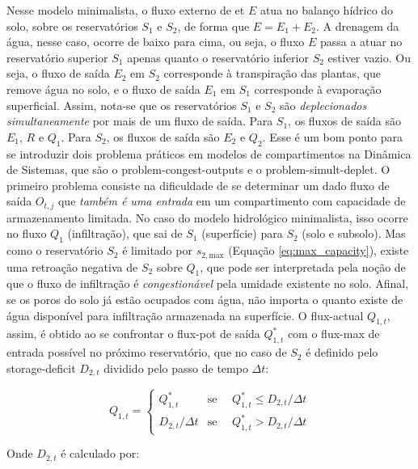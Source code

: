 \documentclass[./main.tex]{subfiles}
\begin{document}
\par Nesse modelo minimalista, o fluxo externo de \acrlong{et} $E$ atua no balanço hídrico do solo, sobre os reservatórios $S_1$ e $S_2$, de forma que $E = E_1 + E_2$. A drenagem da água, nesse caso, ocorre de baixo para cima, ou seja, o fluxo $E$ passa a atuar no reservatório superior $S_1$ apenas quanto o reservatório inferior $S_2$ estiver vazio. Ou seja, o fluxo de saída $E_2$ em $S_2$ corresponde à transpiração das plantas, que remove água no solo, e o fluxo de saída $E_1$ em $S_1$ corresponde à evaporação superficial. Assim, nota-se que os reservatórios $S_1$ e $S_2$ são \textit{deplecionados simultaneamente} por mais de um fluxo de saída. Para $S_1$, os fluxos de saída são $E_1$, $R$ e $Q_1$. Para $S_2$, os fluxos de saída são $E_2$ e $Q_2$. Esse é um bom ponto para se introduzir dois problema práticos em modelos de compartimentos na Dinâmica de Sistemas, que são o \gls{problem-congest-outputs} e o \gls{problem-simult-deplet}. O primeiro problema consiste na dificuldade de se determinar um dado fluxo de saída $O_{t,j}$ que \textit{também é uma entrada} em um compartimento com capacidade de armazenamento limitada. No caso do modelo hidrológico minimalista, isso ocorre no fluxo $Q_1$ (infiltração), que sai de $S_1$ (superfície) para $S_2$ (solo e subsolo). Mas como o reservatório $S_2$ é limitado por $s_{2, \text{max}}$ (Equação \eqref{eq:max_capacity}), existe uma retroação negativa de $S_2$ sobre $Q_1$, que pode ser interpretada pela noção de que o fluxo de infiltração é \textit{congestionável} pela umidade existente no solo. Afinal, se os poros do solo já estão ocupados com água, não importa o quanto existe de água disponível para infiltração armazenada na superfície. O \gls{flux-actual} $Q_{1,t}$, assim, é obtido ao se confrontar o \gls{flux-pot} de saída $Q^*_{1,t}$ com o \gls{flux-max} de entrada possível no próximo reservatório, que no caso de $S_2$ é definido pelo \gls{storage-deficit} $D_{2,t}$ dividido pelo passo de tempo $\Delta t$:
\begin{linenomath*}
\begin{equation} 
	\label{eq:congest_1}
 Q_{1,t} = 
\begin{cases} 
    Q^*_{1,t} & \text{se } \quad Q^*_{1,t} \leq D_{2,t} / \Delta t\\
    D_{2,t} / \Delta t & \text{se } \quad Q^*_{1,t} > D_{2,t} / \Delta t
\end{cases}
\end{equation}
\end{linenomath*}
Onde $D_{2,t}$ é calculado por:
\end{document}
